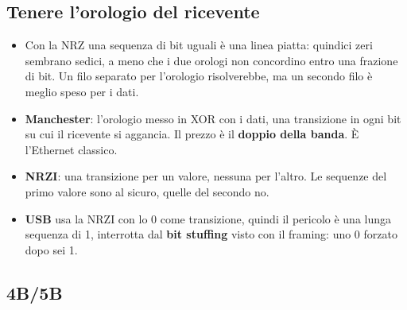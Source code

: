 \subsection{Tenere l'orologio del ricevente}

\begin{itemize}
    \item Con la NRZ una sequenza di bit uguali è una linea piatta: quindici zeri sembrano sedici, a meno che i due orologi non
          concordino entro una frazione di bit. Un filo separato per l'orologio risolverebbe, ma un secondo filo è meglio speso per i
          dati.
    \item \textbf{Manchester}: l'orologio messo in XOR con i dati, una transizione in ogni bit su cui il ricevente si aggancia. Il prezzo
          è il \textbf{doppio della banda}. È l'Ethernet classico.
    \item \textbf{NRZI}: una transizione per un valore, nessuna per l'altro. Le sequenze del primo valore sono al sicuro, quelle del
          secondo no.
    \item \textbf{USB} usa la NRZI con lo 0 come transizione, quindi il pericolo è una lunga sequenza di 1, interrotta dal \textbf{bit
          stuffing} visto con il framing: uno 0 forzato dopo sei 1.
\end{itemize}

\subsection{4B/5B}

